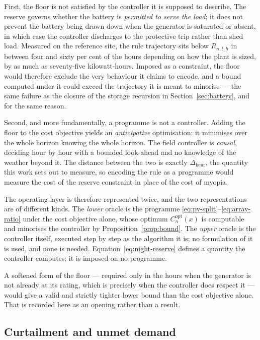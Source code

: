 \documentclass[11pt,a4paper]{article}
\theoremstyle{plain}
\theoremstyle{definition}
\begin{document}
First, the floor is not satisfied by the controller it is supposed to describe. The
reserve governs whether the battery is \emph{permitted to serve the load}; it does not
prevent the battery being drawn down when the generator is saturated or absent, in which
case the controller discharges to the protective trip rather than shed load. Measured on
the reference site, the rule trajectory sits below $R_{n,t,h}$ in between four and sixty
per cent of the hours depending on how the plant is sized, by as much as seventy-five
kilowatt-hours. Imposed as a constraint, the floor would therefore exclude the very
behaviour it claims to encode, and a bound computed under it could exceed the trajectory
it is meant to minorise --- the same failure as the closure of the storage recursion in
Section~\ref{sec:battery}, and for the same reason.

Second, and more fundamentally, a programme is not a controller. Adding the floor to the
cost objective yields an \emph{anticipative} optimisation: it minimises over the whole
horizon knowing the whole horizon. The field controller is \emph{causal}, deciding hour by
hour with a bounded look-ahead and no knowledge of the weather beyond it. The distance
between the two is exactly $\Delta_{\mathrm{heur}}$, the quantity this work sets out to
measure, so encoding the rule as a programme would measure the cost of the reserve
constraint in place of the cost of myopia.

The operating layer is therefore represented twice, and the two representations are of
different kinds. The \emph{lower} oracle is the programme
\eqref{eq:pv-split}--\eqref{eq:array-ratio} under the cost objective alone, whose optimum
$C^{\mathrm{opt}}_n(x)$ is computable and minorises the controller by
Proposition~\ref{prop:bound}. The \emph{upper} oracle is the controller itself, executed
step by step as the algorithm it is; no formulation of it is used, and none is needed.
Equation~\eqref{eq:night-reserve} defines a quantity the controller computes; it is imposed
on no programme.

A softened form of the floor --- required only in the hours when the generator is not
already at its rating, which is precisely when the controller does respect it --- would
give a valid and strictly tighter lower bound than the cost objective alone. That is
recorded here as an opening rather than a result.

\subsection{Curtailment and unmet demand}
\label{sec:slacks}
\end{document}
